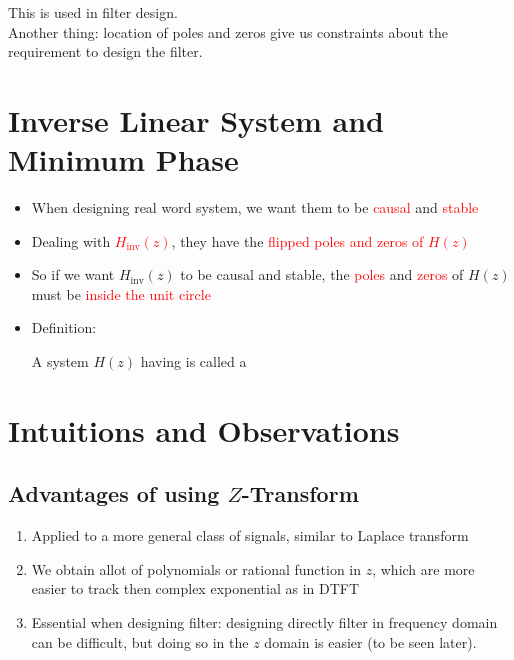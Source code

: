 \documentclass[12pt,a4paper]{book}
\begin{document}
This is used in filter design.\\

Another thing: location of poles and zeros give us constraints about the requirement to design  the filter.



\section{Inverse Linear System and Minimum Phase}

\begin{itemize}

\item When designing real word system, we want them to be \textcolor{red}{causal} and \textcolor{red}{stable}

\item Dealing with \textcolor{red}{$H_{\text{inv}}(z)$}, they have the \textcolor{red}{flipped poles and zeros of $H(z)$}

\item So if we want $H_{\text{inv}}(z)$ to be causal and stable, the \textcolor{red}{poles} and \textcolor{red}{zeros} of $H(z)$ must be \textcolor{red}{inside the unit circle}


\item Definition:

A system $H(z)$ having  is called a 

\end{itemize}


\section{Intuitions and Observations}

\subsection{Advantages of using $Z$-Transform}

\begin{enumerate}
    \item Applied to a more general class of signals, similar to Laplace transform
    
    \item We obtain allot of polynomials or rational function in $z$, which are more easier to track then complex exponential as in DTFT
    
    
    \item Essential when designing filter: designing directly filter in frequency domain can be difficult, but doing so in the $z$ domain is easier (to be seen later).
\end{enumerate}
\end{document}
